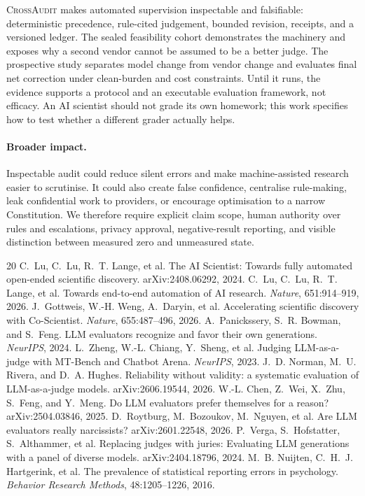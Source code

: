 \documentclass[10pt]{article}
\newcommand{\ca}{\textsc{CrossAudit}}
\begin{document}
\ca{} makes automated supervision inspectable and falsifiable: deterministic
precedence, rule-cited judgement, bounded revision, receipts, and a versioned
ledger. The sealed feasibility cohort demonstrates the machinery and exposes
why a second vendor cannot be assumed to be a better judge. The prospective
study separates model change from vendor change and evaluates final net
correction under clean-burden and cost constraints. Until it runs, the evidence
supports a protocol and an executable evaluation framework, not efficacy. An
AI scientist should not grade its own homework; this work specifies how to test
whether a different grader actually helps.

\paragraph{Broader impact.} Inspectable audit could reduce silent errors and
make machine-assisted research easier to scrutinise. It could also create false
confidence, centralise rule-making, leak confidential work to providers, or
encourage optimisation to a narrow Constitution. We therefore require explicit
claim scope, human authority over rules and escalations, privacy approval,
negative-result reporting, and visible distinction between measured zero and
unmeasured state.

\begin{thebibliography}{20}\small
{} C.~Lu, C.~Lu, R.~T. Lange, et al. The AI Scientist: Towards fully automated open-ended scientific discovery. arXiv:2408.06292, 2024.
 C.~Lu, C.~Lu, R.~T. Lange, et al. Towards end-to-end automation of AI research. \emph{Nature}, 651:914--919, 2026.
 J.~Gottweis, W.-H. Weng, A.~Daryin, et al. Accelerating scientific discovery with Co-Scientist. \emph{Nature}, 655:487--496, 2026.
 A.~Panickssery, S.~R. Bowman, and S.~Feng. LLM evaluators recognize and favor their own generations. \emph{NeurIPS}, 2024.
 L.~Zheng, W.-L. Chiang, Y.~Sheng, et al. Judging LLM-as-a-judge with MT-Bench and Chatbot Arena. \emph{NeurIPS}, 2023.
 J.~D. Norman, M.~U. Rivera, and D.~A. Hughes. Reliability without validity: a systematic evaluation of LLM-as-a-judge models. arXiv:2606.19544, 2026.
 W.-L. Chen, Z.~Wei, X.~Zhu, S.~Feng, and Y.~Meng. Do LLM evaluators prefer themselves for a reason? arXiv:2504.03846, 2025.
 D.~Roytburg, M.~Bozoukov, M.~Nguyen, et al. Are LLM evaluators really narcissists? arXiv:2601.22548, 2026.
 P.~Verga, S.~Hofstatter, S.~Althammer, et al. Replacing judges with juries: Evaluating LLM generations with a panel of diverse models. arXiv:2404.18796, 2024.
 M.~B. Nuijten, C.~H.~J. Hartgerink, et al. The prevalence of statistical reporting errors in psychology. \emph{Behavior Research Methods}, 48:1205--1226, 2016.
\end{thebibliography}
\end{document}
